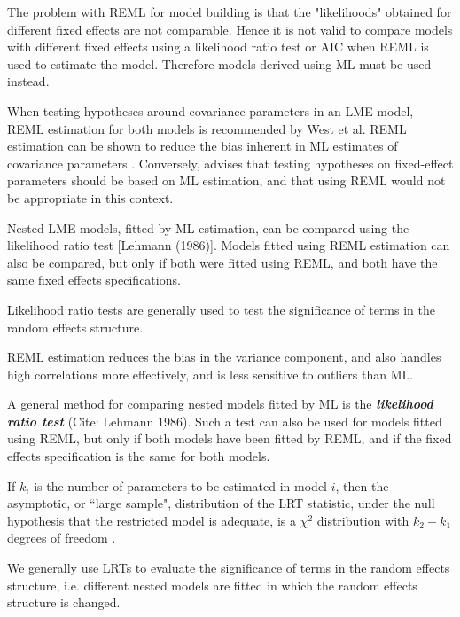 \documentclass[12pt, a4paper]{report}
\theoremstyle{plain}
\theoremstyle{definition}
\theoremstyle{remark}
\begin{document}
The problem with REML for model building is that the "likelihoods" obtained for different fixed effects are not comparable. Hence it is not valid to compare models with different fixed effects using a likelihood ratio test or AIC when REML is used to estimate the model. Therefore models derived using ML must be used instead.

When testing hypotheses around covariance parameters in an LME model, REML estimation for both models is recommended by West et al. REML estimation can be shown to reduce the bias inherent in ML estimates of covariance parameters \citep{west}. Conversely, \citet{pb} advises that testing hypotheses on fixed-effect parameters should be based on ML estimation, and that using REML would not be appropriate in this context.

Nested LME models, fitted by ML estimation, can be compared using the likelihood ratio test [Lehmann (1986)].
Models fitted using REML estimation can also be compared, but only if both were fitted using REML, and both have the same fixed effects specifications.

Likelihood ratio tests are generally used to test the significance of terms in the random effects structure.

REML estimation reduces the bias in the variance component, and also handles high correlations more effectively, and is less sensitive to outliers than ML.  




A general method for comparing nested models fitted by ML is the \textbf{\emph{likelihood ratio test}} (Cite: Lehmann 1986). Such a test can also be used for models fitted using REML, but only if both models have been fitted by REML, and if the fixed effects specification is the same for both models.

If $k_i$ is the number of parameters to be estimated in model $i$, then the asymptotic, or ``large sample", distribution of the LRT statistic, under the null hypothesis that the restricted model is adequate, is a $\chi^2$ distribution with $k_2-k_1$ degrees of freedom \citep[pg.83]{pb}.

We generally use LRTs to evaluate the significance of terms in the random effects structure, i.e. different nested models are fitted in which the random effects structure is changed.
\end{document}

